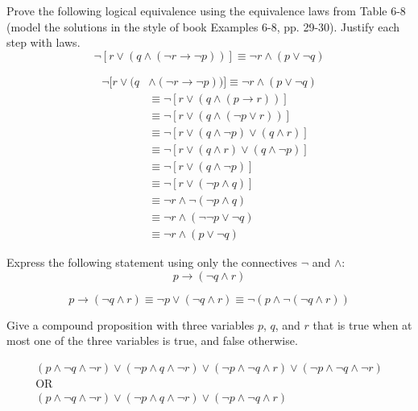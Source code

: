 \documentclass[12pt,addpoints]{exam}
\newcommand{\ra}{\rightarrow}
\begin{document}
\begin{questions}
\question[8] Prove the following logical equivalence using the
equivalence laws from Table 6-8 (model the solutions in the style of
book Examples 6-8, pp. 29-30).  Justify each step with laws.
\[\neg [ r \vee (q \wedge (\neg r \ra \neg p))] \equiv \neg r \wedge (p \vee \neg q) \]
    \ifprintanswers
        \vspace{-30pt}
    \fi
    \begin{solution}
    \begin{align*}
      \neg [ r \vee (q & \wedge (\neg r \ra \neg p))] \equiv \neg r \wedge (p \vee \neg q) \\
        & \equiv \neg [r \vee (q \wedge (p \ra r))] \tag{Table 7, rule 2} \\
        & \equiv \neg [r \vee (q \wedge (\neg p \vee r))] \tag{Table 7, rule 1} \\
        & \equiv \neg [r \vee (q \wedge \neg p) \vee (q \wedge r)] \tag{Distributive} \\
        & \equiv \neg [r \vee (q \wedge r) \vee (q \wedge \neg p)] \tag{Commutative} \\
        & \equiv \neg [r \vee (q \wedge \neg p)] \tag{Absorption} \\
        & \equiv \neg [r \vee (\neg p \wedge q)] \tag{Commutative} \\
        & \equiv \neg r \wedge \neg (\neg p \wedge q) \tag{DeMorgan's} \\
        & \equiv \neg r \wedge (\neg \neg p \vee \neg q) \tag{DeMorgan's} \\
        & \equiv \neg r \wedge (p \vee \neg q) \tag{Double Negation}
    \end{align*}
    \end{solution}
    
    
\question[3] Express the following statement using only the connectives $\neg$ and $\wedge$:
\[ p \ra (\neg q \wedge r) \]
    \ifprintanswers
        \vspace{-30pt}
    \fi
	\begin{solution}
		\[p \ra (\neg q \wedge r) \equiv \neg p \vee (\neg q \wedge r) \equiv \neg (p \wedge \neg (\neg q \wedge r))\]
	\end{solution}
	


\bonusquestion[2] Give a compound proposition with three variables $p$, $q$, and $r$ that is
true when at most one of the three variables is true, and false otherwise.
    \begin{solution}
    \begin{align*}
    (p \wedge \neg q \wedge \neg r) \vee (\neg p \wedge q \wedge \neg r)
      \vee (\neg p \wedge \neg q \wedge r) \vee (\neg p \wedge \neg q \wedge \neg r) \\
    \text{OR} \\
    (p \wedge \neg q \wedge \neg r) \vee (\neg p \wedge q \wedge \neg r)
      \vee (\neg p \wedge \neg q \wedge r) 
    \end{align*}
    \end{solution}
\end{questions}
\end{document}
